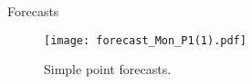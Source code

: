 \documentclass[notes]{beamer}
\begin{document}
\begin{frame}{Forecasts}
\begin{figure}
\centering
\texttt{[image: forecast\_Mon\_P1(1).pdf]}
\caption{Simple point forecasts.}
\label{fig:forecasts} 
\end{figure}
\end{frame}
\end{document}
